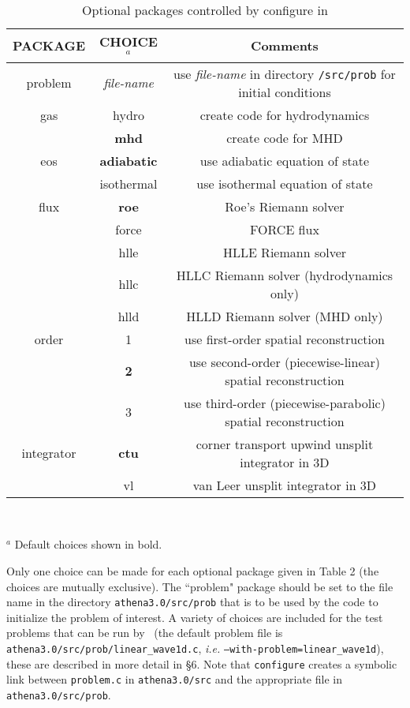 \begin{table}[ht]
\caption{Optional packages controlled by configure in \ath}
\begin{center}
\begin{tabular}{|c|c|c|} \hline \hline
PACKAGE & CHOICE$^{a}$ & Comments \\ \hline
problem & {\it file-name} & use {\it file-name} in directory {\tt /src/prob} for initial conditions \\ \hline
gas    & hydro  & create code for hydrodynamics \\
       & {\bf mhd}    & create code for MHD \\ \hline
eos    & {\bf adiabatic} & use adiabatic equation of state \\
       & isothermal & use isothermal equation of state \\ \hline
flux & {\bf roe} & Roe's Riemann solver \\
     & force & FORCE flux \\
     & hlle & HLLE Riemann solver \\
     & hllc & HLLC Riemann solver (hydrodynamics only) \\
     & hlld & HLLD Riemann solver (MHD only) \\ \hline
order & 1 & use first-order spatial reconstruction \\
      & {\bf 2} & use second-order (piecewise-linear) spatial reconstruction \\
      & 3 & use third-order (piecewise-parabolic) spatial reconstruction \\ \hline
integrator & {\bf ctu} & corner transport upwind unsplit integrator in 3D \\
           & vl & van Leer unsplit integrator in 3D \\
\hline
\end{tabular} \\
\end{center}
$^{a}$ Default choices shown in bold.
\end{table}

Only one choice can be made for each optional package given in Table 2
(the choices are mutually exclusive).  The ``problem" package should be
set to the file name in the directory {\tt athena3.0/src/prob} that is
to be used by the code to initialize the problem of interest.  A variety
of choices are included for the test problems that can be run by \ath\
(the default problem file is {\tt athena3.0/src/prob/linear\_wave1d.c},
{\it i.e.} {\tt --with-problem=linear\_wave1d}), these are described in
more detail in \S 6.  Note that {\tt configure} creates a symbolic link
between {\tt problem.c} in {\tt athena3.0/src} and the appropriate file
in {\tt athena3.0/src/prob}.

